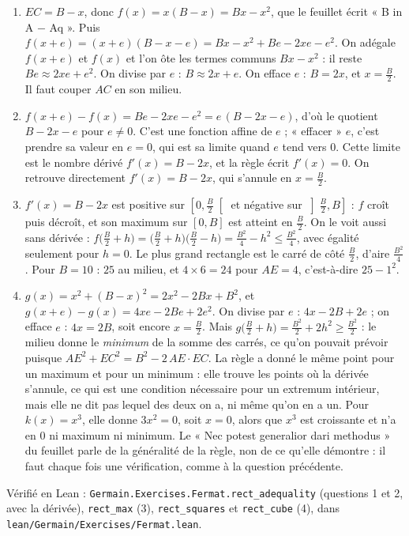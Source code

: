 \documentclass[11pt,a4paper]{article}
\begin{document}
\begin{solution}
\begin{enumerate}
\item $EC = B - x$, donc $f(x) = x(B - x) = Bx - x^2$, que le feuillet écrit
  « B in A $-$ Aq ». Puis
  $f(x+e) = (x+e)(B - x - e) = Bx - x^2 + Be - 2xe - e^2$. On adégale
  $f(x+e)$ et $f(x)$ et l'on ôte les termes communs $Bx - x^2$ : il reste
  $Be \approx 2xe + e^2$. On divise par $e$ : $B \approx 2x + e$. On efface $e$ :
  $B = 2x$, et $x = \frac B2$. Il faut couper $AC$ en son milieu.
\item $f(x+e) - f(x) = Be - 2xe - e^2 = e\,(B - 2x - e)$, d'où le quotient
  $B - 2x - e$ pour $e \neq 0$. C'est une fonction affine de $e$ ; « effacer »
  $e$, c'est prendre sa valeur en $e = 0$, qui est sa limite quand $e$ tend vers
  $0$. Cette limite est le nombre dérivé $f'(x) = B - 2x$, et la règle écrit
  $f'(x) = 0$. On retrouve directement $f'(x) = B - 2x$, qui s'annule en
  $x = \frac B2$.
\item $f'(x) = B - 2x$ est positive sur $\left[0, \frac B2\right[$ et négative
  sur $\left]\frac B2, B\right]$ : $f$ croît puis décroît, et son maximum sur
  $[0, B]$ est atteint en $\frac B2$. On le voit aussi sans dérivée :
  $f\bigl(\frac B2 + h\bigr) = \bigl(\frac B2 + h\bigr)\bigl(\frac B2 - h\bigr)
  = \frac{B^2}{4} - h^2 \le \frac{B^2}{4}$, avec égalité seulement pour $h = 0$.
  Le plus grand rectangle est le carré de côté $\frac B2$, d'aire
  $\frac{B^2}{4}$. Pour $B = 10$ : $25$ au milieu, et $4 \times 6 = 24$ pour
  $AE = 4$, c'est-à-dire $25 - 1^2$.
\item $g(x) = x^2 + (B - x)^2 = 2x^2 - 2Bx + B^2$, et
  $g(x+e) - g(x) = 4xe - 2Be + 2e^2$. On divise par $e$ : $4x - 2B + 2e$ ; on
  efface $e$ : $4x = 2B$, soit encore $x = \frac B2$. Mais
  $g\bigl(\frac B2 + h\bigr) = \frac{B^2}{2} + 2h^2 \ge \frac{B^2}{2}$ : le milieu
  donne le \emph{minimum} de la somme des carrés, ce qu'on pouvait prévoir
  puisque $AE^2 + EC^2 = B^2 - 2\,AE \cdot EC$. La règle a donné le même point
  pour un maximum et pour un minimum : elle trouve les points où la dérivée
  s'annule, ce qui est une condition nécessaire pour un extremum intérieur, mais
  elle ne dit pas lequel des deux on a, ni même qu'on en a un. Pour
  $k(x) = x^3$, elle donne $3x^2 = 0$, soit $x = 0$, alors que $x^3$ est
  croissante et n'a en $0$ ni maximum ni minimum. Le « Nec potest generalior
  dari methodus » du feuillet parle de la généralité de la règle, non de ce
  qu'elle démontre : il faut chaque fois une vérification, comme à la question
  précédente.
\end{enumerate}

Vérifié en Lean : \texttt{Germain.Exercises.Fermat.rect\_adequality} (questions 1 et 2, avec
la dérivée), \texttt{rect\_max} (3), \texttt{rect\_squares} et \texttt{rect\_cube} (4), dans
\texttt{lean/Germain/Exercises/Fermat.lean}.
\end{solution}
\end{document}
